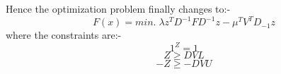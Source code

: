\documentclass[twoside,11pt]{article}
\begin{document}
Hence the optimization problem finally changes to:-
\begin{equation}
  F(x) = min.\; \lambda z^TD^{-1}FD^{-1}z - \mu^TV^TD_{-1}z
\end{equation}
where the constraints are:-
\begin{equation}
  1^Z = 1
\end{equation}
\begin{equation}
  Z \geqslant DVL
\end{equation}
\begin{equation}
  -Z \geqslant -DVU
\end{equation}
\end{document}
